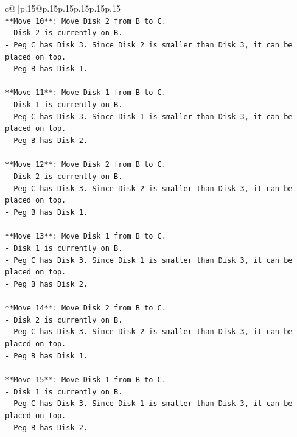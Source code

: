 \documentclass{article}
\begin{document}
{\begin{supertabular}{c@{$\;$}|p{.15\linewidth}@{}p{.15\linewidth}p{.15\linewidth}p{.15\linewidth}p{.15\linewidth}p{.15\linewidth}}
{{{\\ 
\texttt{**Move 10**: Move Disk 2 from B to C.} \\
\texttt{{-} Disk 2 is currently on B.} \\
\texttt{{-} Peg C has Disk 3. Since Disk 2 is smaller than Disk 3, it can be placed on top.} \\
\texttt{{-} Peg B has Disk 1.} \\
\\ 
\texttt{**Move 11**: Move Disk 1 from B to C.} \\
\texttt{{-} Disk 1 is currently on B.} \\
\texttt{{-} Peg C has Disk 3. Since Disk 1 is smaller than Disk 3, it can be placed on top.} \\
\texttt{{-} Peg B has Disk 2.} \\
\\ 
\texttt{**Move 12**: Move Disk 2 from B to C.} \\
\texttt{{-} Disk 2 is currently on B.} \\
\texttt{{-} Peg C has Disk 3. Since Disk 2 is smaller than Disk 3, it can be placed on top.} \\
\texttt{{-} Peg B has Disk 1.} \\
\\ 
\texttt{**Move 13**: Move Disk 1 from B to C.} \\
\texttt{{-} Disk 1 is currently on B.} \\
\texttt{{-} Peg C has Disk 3. Since Disk 1 is smaller than Disk 3, it can be placed on top.} \\
\texttt{{-} Peg B has Disk 2.} \\
\\ 
\texttt{**Move 14**: Move Disk 2 from B to C.} \\
\texttt{{-} Disk 2 is currently on B.} \\
\texttt{{-} Peg C has Disk 3. Since Disk 2 is smaller than Disk 3, it can be placed on top.} \\
\texttt{{-} Peg B has Disk 1.} \\
\\ 
\texttt{**Move 15**: Move Disk 1 from B to C.} \\
\texttt{{-} Disk 1 is currently on B.} \\
\texttt{{-} Peg C has Disk 3. Since Disk 1 is smaller than Disk 3, it can be placed on top.} \\
\texttt{{-} Peg B has Disk 2.} \\
\\ 
}}}
\end{supertabular}}
\end{document}
